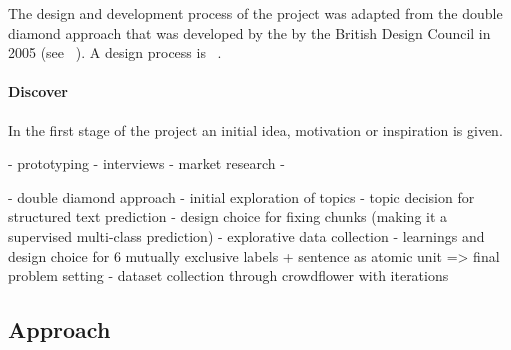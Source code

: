 The design and development process of the project was adapted from the double diamond approach that was developed by the by the British Design Council in 2005 (see ~\cite{Council:2007aa}). A design process is ~\cite{Best:2006aa}.

\paragraph{Discover}
\label{par:Discover}

In the first stage of the project an initial idea, motivation or inspiration is given.

- prototyping
- interviews
- market research
-





- double diamond approach
- initial exploration of topics
- topic decision for structured text prediction
- design choice for fixing chunks (making it a supervised multi-class prediction)
- explorative data collection
- learnings and design choice for 6 mutually exclusive labels + sentence as atomic unit => final problem setting
- dataset collection through crowdflower with iterations










\subsection{Approach}
\label{sub:Approach}

